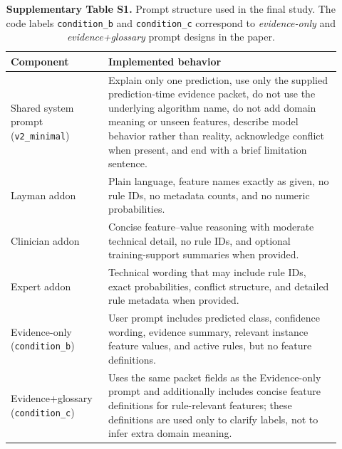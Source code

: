 \documentclass[11pt]{article}
\begin{document}
\begin{table}[H]
\caption*{\textbf{Supplementary Table S1.} Prompt structure used in the final study. The code labels \texttt{condition\_b} and \texttt{condition\_c} correspond to \emph{evidence-only} and \emph{evidence+glossary} prompt designs in the paper.}
\label{tab:prompt-docs-supp}
\centering
\small
\setlength{\tabcolsep}{4pt}
\renewcommand{\arraystretch}{1.05}
\begin{tabular}{L{0.26\linewidth}L{0.66\linewidth}}
\toprule
\textbf{Component} & \textbf{Implemented behavior} \\
\midrule
Shared system prompt (\texttt{v2\_minimal}) & Explain only one prediction, use only the supplied prediction-time evidence packet, do not use the underlying algorithm name, do not add domain meaning or unseen features, describe model behavior rather than reality, acknowledge conflict when present, and end with a brief limitation sentence. \\
Layman addon & Plain language, feature names exactly as given, no rule IDs, no metadata counts, and no numeric probabilities. \\
Clinician addon & Concise feature--value reasoning with moderate technical detail, no rule IDs, and optional training-support summaries when provided. \\
Expert addon & Technical wording that may include rule IDs, exact probabilities, conflict structure, and detailed rule metadata when provided. \\
Evidence-only (\texttt{condition\_b}) & User prompt includes predicted class, confidence wording, evidence summary, relevant instance feature values, and active rules, but no feature definitions. \\
Evidence+glossary (\texttt{condition\_c}) & Uses the same packet fields as the Evidence-only prompt and additionally includes concise feature definitions for rule-relevant features; these definitions are used only to clarify labels, not to infer extra domain meaning. \\
\bottomrule
\end{tabular}
\end{table}
\end{document}
